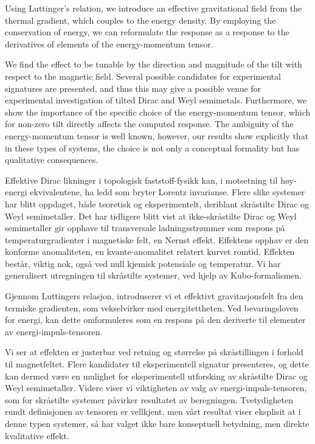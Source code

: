Using Luttinger's relation, we introduce an effective gravitational field from the thermal gradient, which couples to the energy density.
By employing the conservation of energy, we can reformulate the response as a response to the derivatives of elements of the energy-momentum tensor.

We find the effect to be tunable by the direction and magnitude of the tilt with respect to the magnetic field.
Several possible candidates for experimental signatures are presented, and thus this may give a possible venue for experimental investigation of tilted Dirac and Weyl semimetals.
Furthermore, we show the importance of the specific choice of the energy-momentum tensor, which for non-zero tilt directly affects the computed response.
The ambiguity of the energy-momentum tensor is well known, however, our results show explicitly that in these types of systems, the choice is not only a conceptual formality but has qualitative consequences.

Effektive Dirac likninger i topologisk faststoff-fysikk kan, i motsetning til høy-energi ekvivalentene, ha ledd som bryter Lorentz invarianse.
Flere slike systemer har blitt oppdaget, både teoretisk og eksperimentelt, deriblant skråstilte Dirac og Weyl semimetaller.
Det har tidligere blitt vist at ikke-skråstilte Dirac og Weyl semimetaller gir opphave til transversale ladningsstrømmer som respons på temperaturgradienter i magnetiske felt, en Nernst effekt.
Effektens opphav er den konforme anomaliteten, en kvante-anomalitet relatert kurvet romtid.
Effekten består, viktig nok, også ved null kjemisk potensiale og temperatur.
Vi har generalisert utregningen til skråstilte systemer, ved hjelp av Kubo-formalismen.

Gjennom Luttingers relasjon, introduserer vi et effektivt gravitasjonsfelt fra den termiske gradienten, som vekselvirker med energitettheten.
Ved bevaringsloven for energi, kan dette omformuleres som en respons på den deriverte til elementer av energi-impuls-tensoren.

Vi ser at effekten er justerbar ved retning og størrelse på skråstillingen i forhold til magnetfeltet.
Flere kandidater til eksperimentell signatur presenteres, og dette kan dermed være en mulighet for eksperimentell utforsking av skråstilte Dirac og Weyl semimetaller.
Videre viser vi viktigheten av valg av energi-impuls-tensoren, som for skråstilte systemer påvirker resultatet av beregningen.
Tvetydigheten rundt definisjonen av tensoren er vellkjent, men vårt resultat viser eksplisit at i denne typen systemer, så har valget ikke bare konseptuell betydning, men direkte kvalitative effekt.
